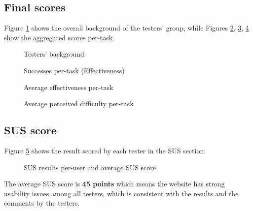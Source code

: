 \subsection{Final scores}
Figure \ref{fig:background_pie} shows the overall background of the testers' group, while Figures \ref{fig:effec_chart}, \ref{fig:effic_chart}, \ref{fig:perc_eff_chart} show the aggregated scores per-task.

\begin{figure}[h]
	\centering
	
	\caption{Testers' background}
	\label{fig:background_pie}
\end{figure}

\begin{figure}[h]
	\centering
	
	\caption{Successes per-task (Effectiveness)}
	\label{fig:effec_chart}
\end{figure}

\begin{figure}[h]
	\centering
	
	\caption{Average effectiveness per-task}
	\label{fig:effic_chart}
\end{figure}

\begin{figure}[h]
	\centering
	
	\caption{Average perceived difficulty per-task}
	\label{fig:perc_eff_chart}
\end{figure}

\subsection{SUS score}
Figure \ref{fig:sus_result} shows the result scored by each tester in the SUS section:
\begin{figure}[h]
	\centering
	
	\caption{SUS results per-user and average SUS score}
	\label{fig:sus_result}
\end{figure}
The average SUS score is \textbf{45 points} which means the website has strong usability issues among all testers, which is consistent with the results and the comments by the testers.

